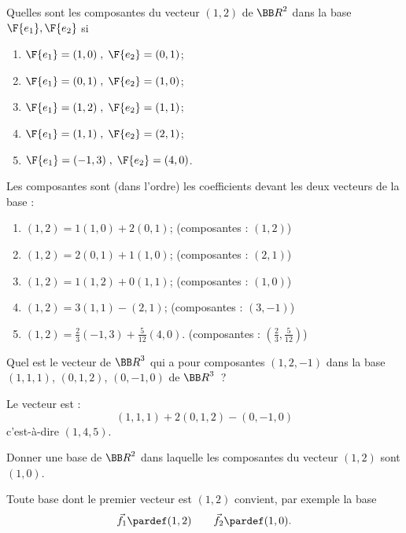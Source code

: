 \documentclass[12pt,french,oneside,a4paper]{memoir} %
\begin{document}
\begin{exo} %
Quelles sont les composantes du vecteur $(1,2)$ de ${\BB R}^2$ dans la base $\F{e_1}, \F{e_2}$ si 
\begin{enumerate}
\item $\F{e_1}=(1,0) \; , \; \F{e_2}=(0,1)$; 
\item $\F{e_1}=(0,1) \; , \; \F{e_2}=(1,0)$; 
\item $\F{e_1}=(1,2) \; , \; \F{e_2}=(1,1)$; 
\item $\F{e_1}=(1,1) \; , \; \F{e_2}=(2,1)$; 
\item $\F{e_1}=(-1,3) \; , \; \F{e_2}=(4,0)$.
\end{enumerate}

\begin{correction}Les composantes sont (dans l'ordre) les coefficients devant les deux vecteurs de la base :
\begin{enumerate}
\item $(1,2) = 1 (1,0) + 2 (0,1)$; (composantes : $(1, 2)$)
\item $(1,2) = 2 (0,1) + 1 (1,0)$; (composantes : $(2, 1)$)
\item $(1,2) = 1 (1,2) + 0 (1,1)$; (composantes : $(1, 0)$)
\item $(1,2) = 3 (1,1) - (2,1)$; (composantes : $(3, -1)$)
\item $(1,2) = \frac{2}{3} (-1,3) + \frac 5{12} (4,0)$. (composantes : $(\frac23, \frac5{12})$)
\end{enumerate}
\end{correction}
\end{exo}
\begin{exo} %
Quel est le vecteur de ${\BB R}^3$ qui a pour composantes $(1,2,-1)$ dans 
la base $(1,1,1)$, $(0,1,2)$, $(0,-1,0)$ de ${\BB R}^3$~?

\begin{correction}
  Le vecteur est :
  \begin{equation*}
    (1,1,1) + 2 (0,1,2) - (0,-1,0)
  \end{equation*}
  c'est-à-dire $(1,4,5)$.
\end{correction}
\end{exo}
\begin{exo}
Donner une base de ${\BB R}^2$ dans laquelle les composantes du vecteur 
$(1,2)$ sont $(1,0)$. 

\begin{correction}
  Toute base dont le premier vecteur est $(1,2)$ convient, par exemple la base
  \begin{equation*}
    \vec{f_{1}} \pardef (1,2) \qquad     \vec{f_{2}} \pardef (1,0).
  \end{equation*}
\end{correction}
\end{exo}
\end{document}
